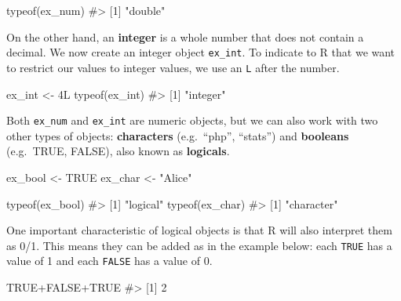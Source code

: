 \documentclass[
  letterpaper,
]{krantz}
\makeatletter
\newenvironment{Shaded}{\begin{snugshade}}{\end{snugshade}}
\newcommand{\CommentTok}[1]{\textcolor[rgb]{0.37,0.37,0.37}{#1}}
\newcommand{\ConstantTok}[1]{\textcolor[rgb]{0.56,0.35,0.01}{#1}}
\newcommand{\FunctionTok}[1]{\textcolor[rgb]{0.28,0.35,0.67}{#1}}
\newcommand{\NormalTok}[1]{\textcolor[rgb]{0.00,0.23,0.31}{#1}}
\newcommand{\OtherTok}[1]{\textcolor[rgb]{0.00,0.23,0.31}{#1}}
\newcommand{\SpecialCharTok}[1]{\textcolor[rgb]{0.37,0.37,0.37}{#1}}
\newcommand{\StringTok}[1]{\textcolor[rgb]{0.13,0.47,0.30}{#1}}
\newenvironment{kframe}{%
\medskip{}
\setlength{\fboxsep}{.8em}
 \def\at@end@of@kframe{}%
 \ifinner\ifhmode%
  \def\at@end@of@kframe{\end{minipage}}%
  \begin{minipage}{\columnwidth}%
 \fi\fi%
 \def\FrameCommand##1{\hskip\@totalleftmargin \hskip-\fboxsep
 \colorbox{shadecolor}{##1}\hskip-\fboxsep
     \hskip-\linewidth \hskip-\@totalleftmargin \hskip\columnwidth}%
 \MakeFramed {\advance\hsize-\width
   \@totalleftmargin\z@ \linewidth\hsize
   \@setminipage}}%
 {\par\unskip\endMakeFramed%
 \at@end@of@kframe}
\renewenvironment{Shaded}{\begin{kframe}}{\end{kframe}}
\makeatother
\begin{document}
\begin{Shaded}
\begin{Highlighting}[]
\FunctionTok{typeof}\NormalTok{(ex\_num)}
\CommentTok{\#\textgreater{} [1] "double"}
\end{Highlighting}
\end{Shaded}

On the other hand, an \textbf{integer} is a whole number that does not
contain a decimal. We now create an integer object \texttt{ex\_int}. To
indicate to R that we want to restrict our values to integer values, we
use an \texttt{L} after the number.

\begin{Shaded}
\begin{Highlighting}[]
\NormalTok{ex\_int }\OtherTok{\textless{}{-}}\NormalTok{ 4L}
\FunctionTok{typeof}\NormalTok{(ex\_int)}
\CommentTok{\#\textgreater{} [1] "integer"}
\end{Highlighting}
\end{Shaded}

Both \texttt{ex\_num} and \texttt{ex\_int} are numeric objects, but we
can also work with two other types of objects: \textbf{characters}
(e.g.~``php'', ``stats'') and \textbf{booleans} (e.g.~TRUE, FALSE), also
known as \textbf{logicals}.

\begin{Shaded}
\begin{Highlighting}[]
\NormalTok{ex\_bool }\OtherTok{\textless{}{-}} \ConstantTok{TRUE}
\NormalTok{ex\_char }\OtherTok{\textless{}{-}} \StringTok{"Alice"}

\FunctionTok{typeof}\NormalTok{(ex\_bool)}
\CommentTok{\#\textgreater{} [1] "logical"}
\FunctionTok{typeof}\NormalTok{(ex\_char)}
\CommentTok{\#\textgreater{} [1] "character"}
\end{Highlighting}
\end{Shaded}

One important characteristic of logical objects is that R will also
interpret them as 0/1. This means they can be added as in the example
below: each \texttt{TRUE} has a value of 1 and each \texttt{FALSE} has a
value of 0.

\begin{Shaded}
\begin{Highlighting}[]
\ConstantTok{TRUE}\SpecialCharTok{+}\ConstantTok{FALSE}\SpecialCharTok{+}\ConstantTok{TRUE}
\CommentTok{\#\textgreater{} [1] 2}
\end{Highlighting}
\end{Shaded}
\end{document}
